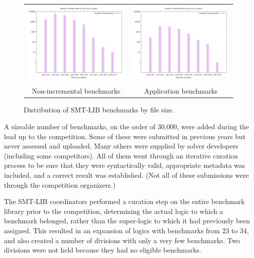 \documentclass[twoside,11pt]{article}
\begin{document}
\begin{figure}
\begin{center}
\begin{tabular}{cc}
\includegraphics[width=.47\textwidth]{smtlib2-file-count-by-size.png}
&
\includegraphics[width=.47\textwidth]{smtlib2-app-file-count-by-size.png}
\\
\\
Non-incremental benchmarks & Application benchmarks
\end{tabular}
\end{center}
\caption{Distribution of SMT-LIB benchmarks by file size.
\label{fig:smtlib-bysize}}
\end{figure}


A sizeable number of benchmarks, on the order of 30,000, were added during the lead up to the competition. Some of these were submitted in previous years but never assessed and uploaded. Many others were supplied by solver developers (including some competitors). All of them went through an iterative curation process to be sure that they were syntactically valid, appropriate metadata was included, and a correct result was established. (Not all of these submissions were through the competition organizers.)

The SMT-LIB coordinators performed a curation step on the entire benchmark library prior to the competition, determining the actual logic to which a benchmark belonged, rather than the super-logic to which it had previously been assigned. This resulted in an expansion of logics with benchmarks from 23 to 34, and also created a number of divisions with only a very few benchmarks. Two divisions were not held because they had no eligible benchmarks.
\end{document}
